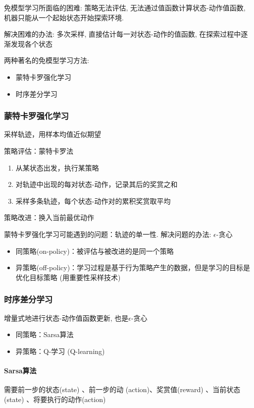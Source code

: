免模型学习所面临的困难: 策略无法评估, 无法通过值函数计算状态-动作值函数, 机器只能从一个起始状态开始探索环境. 

解决困难的办法: 多次采样, 直接估计每一对状态-动作的值函数, 在探索过程中逐渐发现各个状态


两种著名的免模型学习方法:
\begin{itemize}
    \item 蒙特卡罗强化学习
    \item 时序差分学习
\end{itemize}

\subsubsection{蒙特卡罗强化学习}
采样轨迹，用样本均值近似期望

策略评估：蒙特卡罗法
\begin{enumerate}
    \item 从某状态出发，执行某策略
    \item 对轨迹中出现的每对状态-动作，记录其后的奖赏之和
    \item 采样多条轨迹，每个状态-动作对的累积奖赏取平均
\end{enumerate}

策略改进：换入当前最优动作

蒙特卡罗强化学习可能遇到的问题：轨迹的单一性. 解决问题的办法: $\epsilon$-贪心
\begin{itemize}
    \item 同策略(on-policy)：被评估与被改进的是同一个策略
    \item 异策略(off-policy)：学习过程是基于行为策略产生的数据，但是学习的目标是优化目标策略 (用重要性采样技术)
\end{itemize}
\subsubsection{时序差分学习}
增量式地进行状态-动作值函数更新, 也是$\epsilon$-贪心
\begin{itemize}
    \item 同策略：Sarsa算法
    \item 异策略：Q-学习 (Q-learning)
\end{itemize}

\paragraph{Sarsa算法}需要前一步的状态(state) 、前一步的动 (action)、奖赏值(reward) 、当前状态 (state) 、将要执行的动作(action)

